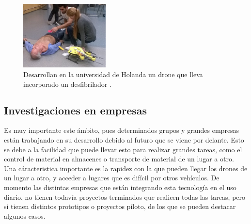 \begin{figure}[H]
	\centering
		\includegraphics[width=0.4\textwidth]{imgs/drone_desfibrilador.jpg}
		\caption{Desarrollan en la universidad de Holanda un drone que lleva incorporado un desfibrilador .}
	\label{fig: Drone con desfibrilador para emergencias.}
\end{figure} 



\subsection{Investigaciones en empresas }
\hspace{1 cm} Es muy importante este \'ambito, pues determinados grupos y grandes empresas est\'an trabajando en su desarrollo debido al futuro que se viene por delante. Esto se debe a la facilidad que puede llevar esto para realizar grandes tareas, como el control de material en almacenes o transporte de material de un lugar a otro. Una c\'aracteristica importante es la rapidez con la que pueden llegar los drones de un lugar a otro, y acceder a lugares que es dif\'icil por otros veh\'iculos. De momento las distintas empresas que est\'an integrando esta tecnolog\'ia en el uso diario, no tienen todav\'ia proyectos terminados que realicen todas las tareas, pero si tienen distintos prototipos o proyectos piloto, de los que se pueden destacar algunos casos.


